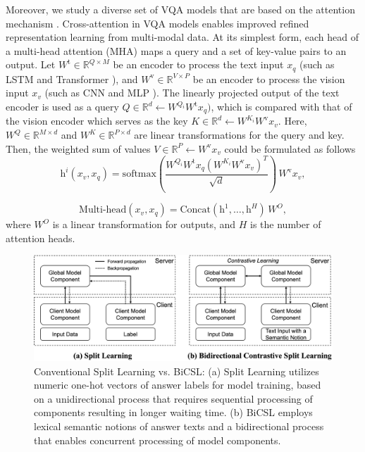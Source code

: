 \documentclass[letterpaper]{article} %
\begin{document}
Moreover, we study a diverse set of VQA models that are based on the attention mechanism \cite{attention2}. Cross-attention in VQA models enables improved refined representation learning from multi-modal data. At its simplest form, each head of a multi-head attention (MHA) maps a query and a set of key-value pairs to an output. Let $W^{\text{t}} \in \mathbb{R}^{Q\times M}$ be an encoder to process the text input $x_q$ (such as LSTM \cite{lstm} and Transformer \cite{attention2}), and $W^{\text{v}} \in \mathbb{R}^{V\times P}$ be an encoder to process the vision input $x_v$ (such as CNN \cite{cnn} and MLP \cite{mlp}). The linearly projected output of the text encoder is used as a query $Q \in \mathbb{R}^d \leftarrow W^{Q_i}W^{\text{t}}x_q)$, which is compared with that of the vision encoder which serves as the key $K \in \mathbb{R}^d \leftarrow W^{K_i}W^{\text{v}}x_v$. Here, $W^Q \in \mathbb{R}^{M\times d}$ and $W^K \in \mathbb{R}^{P\times d}$ are linear transformations for the query and key. Then, the weighted sum of values $V \in \mathbb{R}^{P} \leftarrow W^{\text{v}}x_v$ could be formulated as follows
$$\mbox{h}^i(x_v,x_q)=\mbox{softmax}(\frac{W^{Q_i}W^{\text{t}}x_q(W^{K_i}W^{\text{v}}x_v)^T}{\sqrt{d}})\,W^{\text{v}}x_v,$$

\begin{equation}\mbox{Multi-head}(x_v,x_q)=\mbox{Concat}(\mbox{h}^1,\dots,\mbox{h}^H)\,W^O,
\end{equation}
where $W^O$ is a linear transformation for outputs, and $H$ is the number of attention heads.

\begin{figure}[!t]
    \raggedright
    \includegraphics[width=\linewidth]{figures/unissl.png}
    \caption{Conventional Split Learning vs. BiCSL: (a) Split Learning utilizes numeric one-hot vectors of answer labels for model training, based on a unidirectional process that requires sequential processing of components resulting in longer waiting time. (b) BiCSL employs lexical semantic notions of answer texts and a bidirectional process that enables concurrent processing of model components.}
    \label{fig:compare}
\end{figure}
\end{document}
